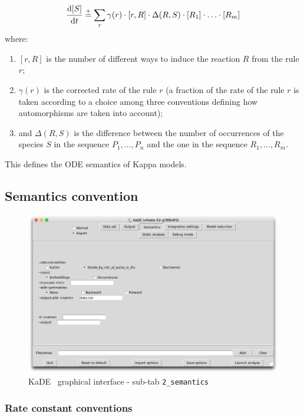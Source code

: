 \documentclass[11pt]{book}
\def\KaDE{\textsf{KaDE}}
\begin{document}
\newcommand{\myfrac}[2]{\frac{\strut \displaystyle #1}{\strut \displaystyle #2}}
\newcommand{\diff}[1]{\myfrac{\mathrm{d}#1}{\mathrm{d}t}}

\begin{equation*}
  \diff{[S]} \stackrel{+}= \sum_r \gamma(r)\cdot[r,R]\cdot\Delta(R,S)\cdot [R_1] \cdot \ldots \cdot [R_m]
\end{equation*}
where:
\begin{enumerate}
  \item $[r,R]$ is the number of different ways to induce the reaction $R$ from the rule $r$;
  \item $\gamma(r)$ is the corrected rate of the rule $r$ (a fraction of the rate of the rule $r$ is taken according to a choice among three  conventions defining how automorphisms are taken into account);
  \item and $\Delta(R,S)$ is the difference between the number of occurrences of the species $S$ in the sequence $P_1,\ldots,P_n$ and
the one in the sequence $R_1,\ldots,R_m$.
 \end{enumerate}

 This defines the ODE semantics of Kappa models.

\subsection{Semantics convention}

\begin{figure}[htbp]
\centering
\includegraphics[width=12cm,bb=0 0 1904 1208]{img/kade_2.png}
\caption{\KaDE~ graphical interface - sub-tab \texttt{2\_semantics}}
\label{fig:kade:2}
\end{figure}

\subsubsection{Rate constant conventions}
\end{document}
